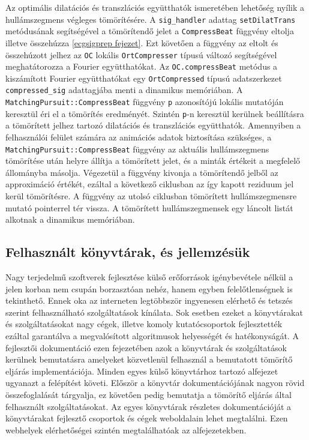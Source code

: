 \documentclass[oneside,titlepage,12pt,a4paper]{report}
\begin{document}
\par Az optimális dilatációs és transzlációs együtthatók ismeretében lehetőség nyílik a hullámszegmens végleges tömörítésére. A \texttt{sig\_handler} adattag \texttt{setDilatTrans} metódusának segítségével a tömörítendő jelet a \texttt{CompressBeat} függvény eltolja illetve összehúzza \ref{ecgsigprep fejezet}. Ezt követően a függvény az eltolt és összehúzott jelhez az \texttt{OC} lokális \texttt{OrtCompresser} típusú változó segítségével meghatátorozza a Fourier együtthatókat. Az \texttt{OC.compressBeat} metódus a kiszámított Fourier együtthatókat egy \texttt{OrtCompressed} típusú adatszerkezet \texttt{compressed\_sig} adattagjába menti a dinamikus memóriában. A \texttt{MatchingPursuit::CompressBeat} függvény \texttt{p} azonosítójú lokális mutatóján keresztül éri el a tömörítés eredményét. Szintén \texttt{p}-n keresztül kerülnek beállításra a tömörített jelhez tartozó dilatációs és transzlációs együtthatók. Amennyiben a felhasználói felület számára az animációs adatok biztosítása szükséges, a \linebreak \texttt{MatchingPursuit::CompressBeat} függvény az aktuális hullámszegmens tömörítése után helyre állítja a tömörített jelet, és a minták értékeit a megfelelő állományba másolja. Végezetül a függvény kivonja a tömörítendő jelből az approximáció értékét, ezáltal a következő ciklusban az így kapott reziduum jel kerül tömörítésre. A függvény az utolsó ciklusban tömörített hullámszegmensre mutató pointerrel tér vissza. A tömörített hullámszegmensek egy láncolt listát alkotnak a dinamikus memóriában. 

\subsection{Felhasznált könyvtárak, és jellemzésük}

Nagy terjedelmű szoftverek fejlesztése külső erőforrások igénybevétele nélkül a jelen korban nem csupán borzasztóan nehéz, hanem egyben felelőtlenségnek is tekinthető. Ennek oka az interneten legtöbbször ingyenesen elérhető és tetszés szerint felhasználható szolgáltatások kínálata. Sok esetben ezeket a könyvtárakat és szolgáltatásokat nagy cégek, illetve komoly kutatócsoportok fejlesztették ezáltal garantálva a megvalósított algoritmusok helyességét és hatékonyságát. A fejlesztői dokumentáció ezen fejezetében azok a könyvtárak és szolgáltatások kerülnek bemutatásra amelyeket közvetlenül felhasznál a bemutatott tömörítő eljárás implementációja. Minden egyes külső könyvtárhoz tartozó alfejezet ugyanazt a felépítést követi. Először a könyvtár dokumentációjának nagyon rövid összefoglalását tárgyalja, ez követően pedig  bemutatja a tömörítő eljárás által felhasznált szolgáltatásokat. Az egyes könyvtárak részletes dokumentációját a könyvtárakat fejlesztő csoportok és cégek weboldalain lehet megtalálni. Ezen webhelyek elérhetőségei szintén megtalálhatóak az alfejezetekben. 
\end{document}
